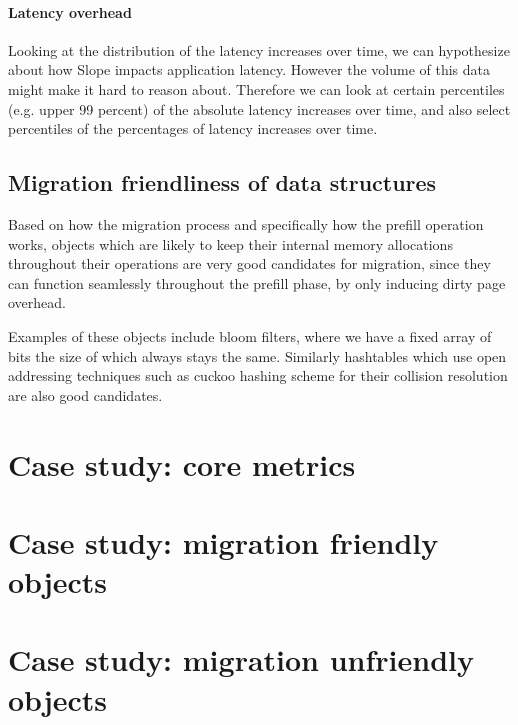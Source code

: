\paragraph{Latency overhead}
Looking at the distribution of the latency increases over time, we can
hypothesize about how Slope impacts application latency. However the volume of
this data might make it hard to reason about. Therefore we can look at certain
percentiles (e.g. upper 99 percent) of the absolute latency increases over time,
and also select percentiles of the percentages of latency increases over time.


\subsection{Migration friendliness of data structures}
Based on how the migration process and specifically how the prefill operation
works, objects which are likely to keep their internal memory allocations
throughout their operations are very good candidates for migration, since they
can function seamlessly throughout the prefill phase, by only inducing dirty
page overhead.

Examples of these objects include bloom filters, where we have a fixed
array of bits the size of which always stays the same.
Similarly hashtables which use open addressing techniques such as cuckoo
hashing scheme for their collision resolution are also good candidates.

\section{Case study: core metrics}

\section{Case study: migration friendly objects}

\section{Case study: migration unfriendly objects}


